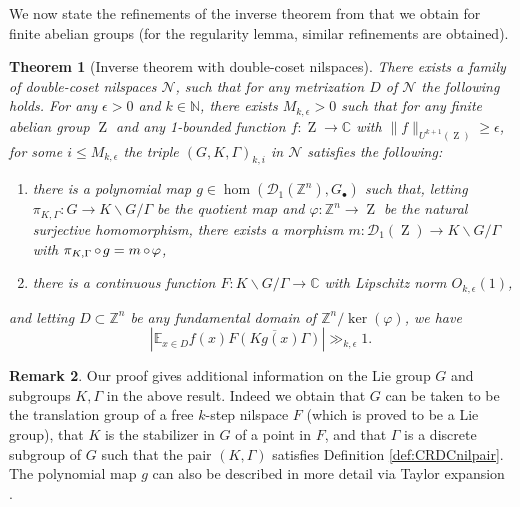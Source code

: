 \documentclass[a4paper,12pt,reqno]{amsart}
\newtheorem{theorem}{Theorem}[section]
\theoremstyle{definition}
\newtheorem{remark}[theorem]{Remark}
\def\to{\rightarrow}
\newcommand{\mc}{\mathcal}
\newcommand{\mb}{\mathbb}
\DeclareMathOperator{\ab}{Z}
\DeclareMathOperator{\co}{\circ\hspace{-0.02 cm}}
\begin{document}
We now state the refinements of the inverse theorem from \cite{CSinverse} that we obtain for finite abelian groups (for the regularity lemma, similar refinements are obtained).
\begin{theorem}[Inverse theorem with double-coset nilspaces]\label{thm:inv-double-coset-intro} There exists a family of double-coset nilspaces $\mc{N}$, such that for any metrization $D$ of $\mc{N}$ the following holds. For any  $\epsilon>0$ and $k\in\mb{N}$,  there exists $M_{k,\epsilon}>0$ such that for any finite abelian group $\ab$ and any 1-bounded  function $f:\ab\to \mb{C}$  with $\|f\|_{U^{k+1}(\ab)}\ge \epsilon$, for some $i\leq M_{k,\epsilon}$ the triple $(G,K,\Gamma)_{k,i}$ in $\mc{N}$  satisfies the following:
\setlength{\leftmargini}{0.7cm}
\begin{enumerate}
    \item there is a polynomial map $g\in \hom(\mc{D}_1(\mb{Z}^n),G_\bullet)$ such that, letting $\pi_{K,\Gamma}:G\to K\backslash G/\Gamma$ be the quotient map and $\varphi:\mb{Z}^n\to\ab$ be the natural surjective homomorphism, there exists a morphism $m:\mc{D}_1(\ab)\to K\backslash G/\Gamma$ with $\pi_{K,\Gamma}\co g = m\co \varphi$,
    \item there is a continuous function $F:K\backslash G/\Gamma\to \mb{C}$ with Lipschitz norm $O_{k,\epsilon}(1)$,
\end{enumerate}
and letting $D\subset \mb{Z}^n$ be any fundamental domain of $\mb{Z}^n/\ker(\varphi)$, we have
\[
\left|\mb{E}_{x\in D} f(x) \overline{F\left(K g(x) \Gamma\right)}\right|\gg_{k,\epsilon} 1.
\]
\end{theorem}
\begin{remark}
Our proof gives additional information on the Lie group $G$ and subgroups $K,\Gamma$ in the above result. Indeed we obtain that $G$ can be taken to be the translation group of a free $k$-step nilspace $F$ (which is  proved to be a Lie group), that $K$ is the stabilizer in $G$ of a point in $F$, and that $\Gamma$ is a discrete subgroup of $G$ such that the pair $(K,\Gamma)$ satisfies Definition \ref{def:CRDCnilpair}. The polynomial map $g$ can also be described in more detail via Taylor expansion \cite[Lemma B.9]{GTZ}. 
\end{remark}
\end{document}
